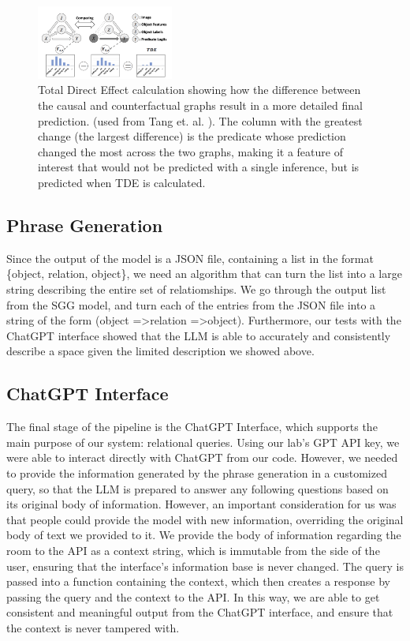 \documentclass[letterpaper, 10 pt, conference]{ieeeconf}  %
\begin{document}
        \begin{figure}
            \centering
            \includegraphics[width=0.4\textwidth]{images/counterfactual.png}
            \caption{Total Direct Effect calculation showing how the difference between the causal and counterfactual graphs result in a more detailed final prediction. (used from Tang et. al. \cite{tang2020unbiased}). The column with the greatest change (the largest difference) is the predicate whose prediction changed the most across the two graphs, making it a feature of interest that would not be predicted with a single inference, but is predicted when TDE is calculated.}
            \label{fig:counterfactual}
        \end{figure}


    
    \subsection*{Phrase Generation}
        Since the output of the model is a JSON file, containing a list in the format \{object, relation, object\}, we need an algorithm that can turn the list into a large string describing the entire set of relatiomships. We go through the output list from the SGG model, and turn each of the entries from the JSON file into a string of the form (object =\textgreater  relation =\textgreater  object). Furthermore, our tests with the ChatGPT interface showed that the LLM is able to accurately and consistently describe a space given the limited description we showed above.
    
    \subsection*{ChatGPT Interface}
        The final stage of the pipeline is the ChatGPT Interface, which supports the main purpose of our system: relational queries. Using our lab's GPT API key, we were able to interact directly with ChatGPT from our code. However, we needed to provide the information generated by the phrase generation in a customized query, so that the LLM is prepared to answer any following questions based on its original body of information. However, an important consideration for us was that people could provide the model with new information, overriding the original body of text we provided to it. We provide the body of information regarding the room to the API as a context string, which is immutable from the side of the user, ensuring that the interface's information base is never changed. The query is passed into a function containing the context, which then creates a response by passing the query and the context to the API. In this way, we are able to get consistent and meaningful output from the ChatGPT interface, and ensure that the context is never tampered with.
\end{document}
